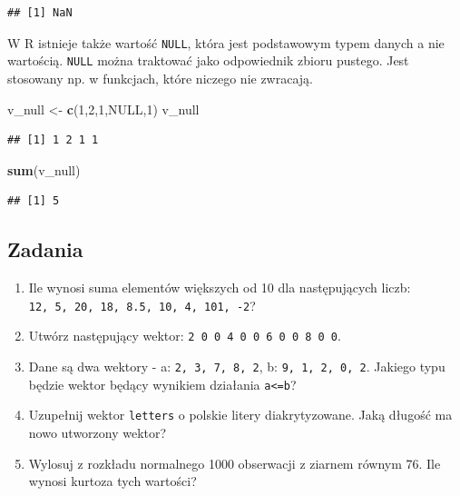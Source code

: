 \documentclass[]{book}
\newenvironment{Shaded}{\begin{snugshade}}{\end{snugshade}}
\newcommand{\KeywordTok}[1]{\textcolor[rgb]{0.13,0.29,0.53}{\textbf{#1}}}
\newcommand{\DecValTok}[1]{\textcolor[rgb]{0.00,0.00,0.81}{#1}}
\newcommand{\StringTok}[1]{\textcolor[rgb]{0.31,0.60,0.02}{#1}}
\newcommand{\OtherTok}[1]{\textcolor[rgb]{0.56,0.35,0.01}{#1}}
\newcommand{\NormalTok}[1]{#1}
\providecommand{\tightlist}{%
  \setlength{\itemsep}{0pt}\setlength{\parskip}{0pt}}
\begin{document}
\begin{verbatim}
## [1] NaN
\end{verbatim}

W R istnieje także wartość \texttt{NULL}, która jest podstawowym typem
danych a nie wartością. \texttt{NULL} można traktować jako odpowiednik
zbioru pustego. Jest stosowany np. w funkcjach, które niczego nie
zwracają.

\begin{Shaded}
\begin{Highlighting}[]
\NormalTok{v_null <-}\StringTok{ }\KeywordTok{c}\NormalTok{(}\DecValTok{1}\NormalTok{,}\DecValTok{2}\NormalTok{,}\DecValTok{1}\NormalTok{,}\OtherTok{NULL}\NormalTok{,}\DecValTok{1}\NormalTok{)}
\NormalTok{v_null}
\end{Highlighting}
\end{Shaded}

\begin{verbatim}
## [1] 1 2 1 1
\end{verbatim}

\begin{Shaded}
\begin{Highlighting}[]
\KeywordTok{sum}\NormalTok{(v_null)}
\end{Highlighting}
\end{Shaded}

\begin{verbatim}
## [1] 5
\end{verbatim}

\subsection{Zadania}\label{zadania}

\begin{enumerate}
\def\labelenumi{\arabic{enumi}.}
\tightlist
\item
  Ile wynosi suma elementów większych od 10 dla następujących liczb:
  \texttt{12,\ 5,\ 20,\ 18,\ 8.5,\ 10,\ 4,\ 101,\ -2}?
\item
  Utwórz następujący wektor:
  \texttt{2\ 0\ 0\ 4\ 0\ 0\ 6\ 0\ 0\ 8\ 0\ 0}.
\item
  Dane są dwa wektory - a: \texttt{2,\ 3,\ 7,\ 8,\ 2}, b:
  \texttt{9,\ 1,\ 2,\ 0,\ 2}. Jakiego typu będzie wektor będący wynikiem
  działania \texttt{a\textless{}=b}?
\item
  Uzupełnij wektor \texttt{letters} o polskie litery diakrytyzowane.
  Jaką długość ma nowo utworzony wektor?
\item
  Wylosuj z rozkładu normalnego 1000 obserwacji z ziarnem równym 76. Ile
  wynosi kurtoza tych wartości?
\end{enumerate}
\end{document}
